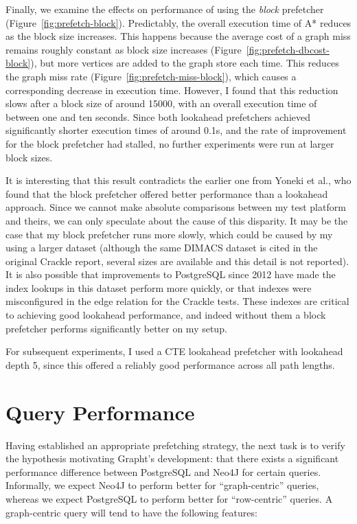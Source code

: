 Finally, we examine the effects on performance of using the \textit{block}
prefetcher (Figure~\ref{fig:prefetch-block}). Predictably, the overall
execution time of A* reduces as the block size increases. This happens because
the average cost of a graph miss remains roughly constant as block size
increases (Figure~\ref{fig:prefetch-dbcost-block}), but more vertices are
added to the graph store each time. This reduces the graph miss rate
(Figure~\ref{fig:prefetch-miss-block}), which causes a corresponding decrease in execution
time. However, I found that this reduction slows after a block size of around
15000, with an  overall execution time of between one and ten seconds. Since
both lookahead prefetchers achieved significantly shorter execution times of around 0.1s, and the
rate of improvement for the block prefetcher had stalled, no further
experiments were run at larger block sizes. 

It is interesting that this result contradicts the earlier one from Yoneki et
al., who found that the block prefetcher offered better performance than a
lookahead approach. Since we cannot make absolute comparisons between my test
platform and theirs, we can only speculate about the cause of this disparity.
It may be the case that my block prefetcher runs more slowly, which could be
caused by my using a larger dataset (although the same DIMACS dataset is cited
in the original Crackle report, several sizes are available and this detail is
not reported). It is also possible that improvements to PostgreSQL since 2012
have made the index lookups in this dataset perform more quickly, or that
indexes were misconfigured in the edge relation for the Crackle tests. These
indexes are critical to achieving good lookahead performance, and indeed
without them a block prefetcher performs significantly better on my setup.


For subsequent experiments, I used a CTE lookahead prefetcher with lookahead depth
5, since this offered a reliably good performance across all path lengths. 


\section{Query Performance} %
\label{sec:query_performance}
 
Having established an appropriate prefetching strategy, the next task is to
verify the hypothesis motivating Grapht's development: that there exists a significant
performance difference between PostgreSQL and Neo4J for certain queries.
Informally, we expect Neo4J to perform better for ``graph-centric'' queries,
whereas we expect PostgreSQL to perform better for ``row-centric'' queries. A
graph-centric query will tend to have the following features:

